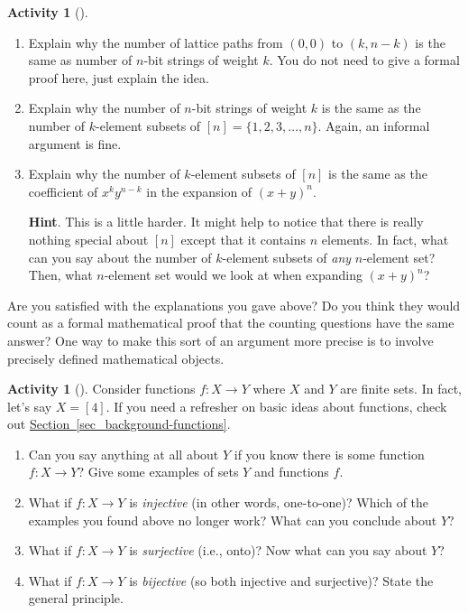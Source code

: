 \documentclass[10pt,]{book}
\theoremstyle{plain}
\theoremstyle{definition}
\theoremstyle{definition}
\theoremstyle{definition}
\newtheorem{activity}[project]{Activity}
\numberwithin{equation}{chapter}
\begin{document}
\begin{activity}[]\label{activity-61}
\leavevmode%
\begin{enumerate}[font=\bfseries,label=(\alph*),ref=\alph*]
\item\label{task-88} \hypertarget{p-509}{}%
Explain why the number of lattice paths from \((0,0)\) to \((k,n-k)\) is the same as number of \(n\)-bit strings of weight \(k\). You do not need to give a formal proof here, just explain the idea.%
\item\label{task-89} \hypertarget{p-510}{}%
Explain why the number of \(n\)-bit strings of weight \(k\) is the same as the number of \(k\)-element subsets of \([n] = \{1,2,3,\ldots, n\}\).   Again, an informal argument is fine.%
\item\label{task-90} \hypertarget{p-511}{}%
Explain why the number of \(k\)-element subsets of \([n]\) is the same as the coefficient of \(x^ky^{n-k}\) in the expansion of \((x+y)^n\).%
\par\smallskip%
\noindent\textbf{Hint}.\hypertarget{hint-26}{}\quad%
\hypertarget{p-512}{}%
This is a little harder.  It might help to notice that there is really nothing special about \([n]\) except that it contains \(n\) elements.  In fact, what can you say about the number of \(k\)-element subsets of \emph{any} \(n\)-element set?  Then, what \(n\)-element set would we look at when expanding \((x+y)^n\)?%
\end{enumerate}
\end{activity}
\hypertarget{p-513}{}%
Are you satisfied with the explanations you gave above?  Do you think they would count as a formal mathematical proof that the counting questions have the same answer?  One way to make this sort of an argument more precise is to involve precisely defined mathematical objects.%
\begin{activity}[]\label{activity-62}
\hypertarget{p-514}{}%
Consider functions \(f:X \to Y\) where \(X\) and \(Y\) are finite sets.  In fact, let's say \(X = [4]\). If you need a refresher on basic ideas about functions, check out \hyperref[sec_background-functions]{Section~\ref{sec_background-functions}}.%
\begin{enumerate}[font=\bfseries,label=(\alph*),ref=\alph*]
\item\label{task-91} \hypertarget{p-515}{}%
Can you say anything at all about \(Y\) if you know there is some function \(f:X \to Y\)?  Give some examples of sets \(Y\) and functions \(f\).%
\item\label{task-92} \hypertarget{p-516}{}%
What if \(f:X \to Y\) is \emph{injective} (in other words, one-to-one)?  Which of the examples you found above no longer work?  What can you conclude about \(Y\)?%
\item\label{task-93} \hypertarget{p-517}{}%
What if \(f:X \to Y\) is \emph{surjective} (i.e., onto)?  Now what can you say about \(Y\)?%
\item\label{task-94} \hypertarget{p-518}{}%
What if \(f:X\to Y\) is \emph{bijective} (so both injective and surjective)?  State the general principle.%
\end{enumerate}
\end{activity}
\end{document}
